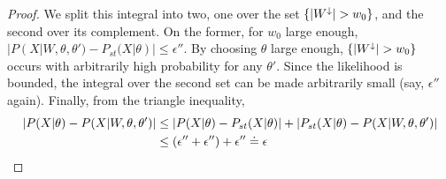 \begin{proof}
We split this integral into two, one over the set $\{{|W^\downarrow}| > w_0\}$, and 
the second over its complement. On the former, for $w_0$ large enough, 
$|P(X |W, \theta, \theta')-P_{st}(X|\theta)|
\le \epsilon''$. %
By choosing $\theta$ large enough, $\{{|W^\downarrow}| > w_0\}$ occurs
with arbitrarily high probability for any $\theta'$. Since the likelihood is bounded, the
integral over the second set can be made arbitrarily small (say, $\epsilon''$ again). 
Finally, from the triangle
inequality,
\begin{align*}
|P(X | \theta) - P(X | W, \theta, \theta')| &\leq |P(X | \theta) -P_{st}(X | \theta) | + | P_{st}(X | \theta) -  P(X | W, \theta, \theta')|\\
       & \leq (\epsilon'' + \epsilon'') + \epsilon'' \doteq \epsilon
\end{align*}
\end{proof}

